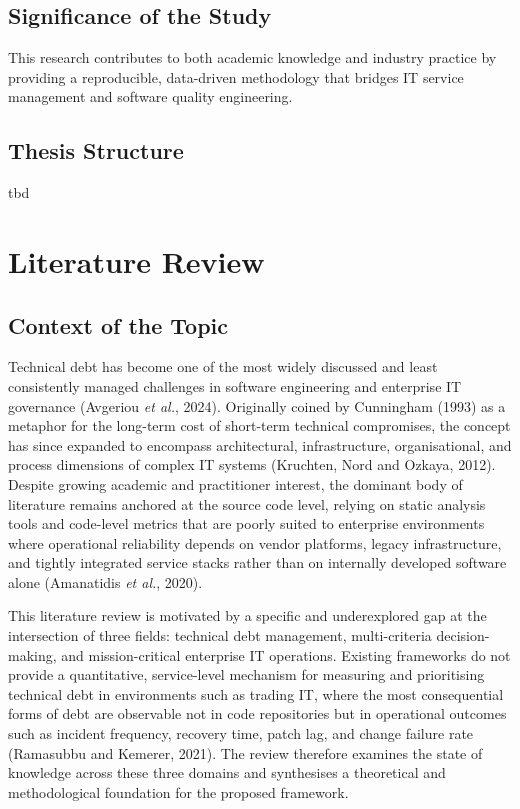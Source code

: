 \documentclass[
  11pt,
  letterpaper,
  11pt,
  oneside,
  english,
  onehalfspacing,
  headsepline]{MastersDoctoralThesis}
\begin{document}
\section{Significance of the Study}\label{significance-of-the-study}

This research contributes to both academic knowledge and industry
practice by providing a reproducible, data-driven methodology that
bridges IT service management and software quality engineering.

\section{Thesis Structure}\label{thesis-structure}

tbd


\chapter{Literature Review}\label{literature-review}

\section{Context of the Topic}\label{context-of-the-topic}

Technical debt has become one of the most widely discussed and least
consistently managed challenges in software engineering and enterprise
IT governance (Avgeriou \emph{et al.}, 2024). Originally coined by
Cunningham (1993) as a metaphor for the long-term cost of short-term
technical compromises, the concept has since expanded to encompass
architectural, infrastructure, organisational, and process dimensions of
complex IT systems (Kruchten, Nord and Ozkaya, 2012). Despite growing
academic and practitioner interest, the dominant body of literature
remains anchored at the source code level, relying on static analysis
tools and code-level metrics that are poorly suited to enterprise
environments where operational reliability depends on vendor platforms,
legacy infrastructure, and tightly integrated service stacks rather than
on internally developed software alone (Amanatidis \emph{et al.}, 2020).

This literature review is motivated by a specific and underexplored gap
at the intersection of three fields: technical debt management,
multi-criteria decision-making, and mission-critical enterprise IT
operations. Existing frameworks do not provide a quantitative,
service-level mechanism for measuring and prioritising technical debt in
environments such as trading IT, where the most consequential forms of
debt are observable not in code repositories but in operational outcomes
such as incident frequency, recovery time, patch lag, and change failure
rate (Ramasubbu and Kemerer, 2021). The review therefore examines the
state of knowledge across these three domains and synthesises a
theoretical and methodological foundation for the proposed framework.
\end{document}
